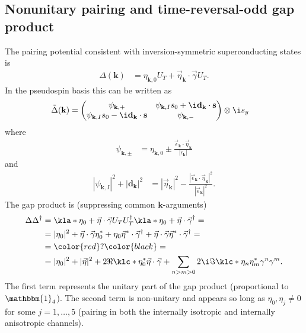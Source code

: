 \documentclass[english, parskip=full]{scrartcl}
\newcommand{\qna}[1]{\color{red}#1\color{black}}
\begin{document}
\subsection{Nonunitary pairing and time-reversal-odd gap product}
The pairing potential consistent with inversion-symmetric superconducting states is
\begin{align}
\Delta (\textbf{k}) &= \eta_{\textbf{k},0} U_T + \vec{\eta}_\textbf{k} \cdot \vec{\gamma} U_T.
\end{align}
In the pseudospin basis this can be written as
\begin{align}
\tilde{\Delta}(\textbf{k}) &= \begin{pmatrix}
\psi_{\textbf{k},+} & \psi_{\textbf{k},I}s_0 + \i \textbf{d}_\textbf{k} \cdot \textbf{s} \\
\psi_{\textbf{k},I}s_0 - \i \textbf{d}_\textbf{k} \cdot \textbf{s} & \psi_{\textbf{k},-}
\end{pmatrix} \otimes \i s_y
\end{align}
where 
\begin{align}
\psi_{\textbf{k}, \pm} &= \eta_{\textbf{k},0} \pm \frac{\vec{
\epsilon}_\textbf{k} \cdot \vec{\eta}_\textbf{k}}{|\epsilon_\textbf{k}|}
\end{align}
and 
\begin{align}
|\psi_{\textbf{k},I}|^2 + |\textbf{d}_\textbf{k}|^2 &= |\vec{\eta}_\textbf{k}|^2 - \frac{|\vec{\epsilon}_\textbf{k} \cdot \vec{\eta}_\textbf{k}|^2}{|\vec{\epsilon}_\textbf{k}|^2}.
\end{align}
The gap product is (suppressing common $\textbf{k}$-arguments)
\begin{align}
\Delta\Delta^\dagger &= \kla*{\eta_0 + \vec{\eta} \cdot \vec{\gamma}} U_T U_T^\dagger \kla*{\eta_0 + \vec{\eta} \cdot \vec{\gamma}}^\dagger = \\
&= |\eta_0|^2 + \vec{\eta}\cdot \vec{\gamma} \eta_0^\ast + \eta_0 \vec{\eta}^\ast \cdot \vec{\gamma}^\dagger + \vec{\eta}\cdot \vec{\gamma} \vec{\eta}^\ast \cdot \vec{\gamma}^\dagger = \\
&= \qna{?} = \\
&= |\eta_0|^2 + |\vec{\eta}|^2 + 2\Re \klc*{\eta_0^\ast \vec{\eta}} \cdot \vec{\gamma} + \sum_{n>m>0} 2\i\Im \klc*{\eta_n \eta_m^\ast }\gamma^n\gamma^m.
\end{align}
The first term represents the unitary part of the gap product (proportional to $\mathbbm{1}_4$).
The second term is non-unitary and appears so long as $\eta_0,\eta_j\neq 0$ for some $j=1,\dots,5$ (pairing in both the internally isotropic and internally anisotropic channels).
\end{document}
